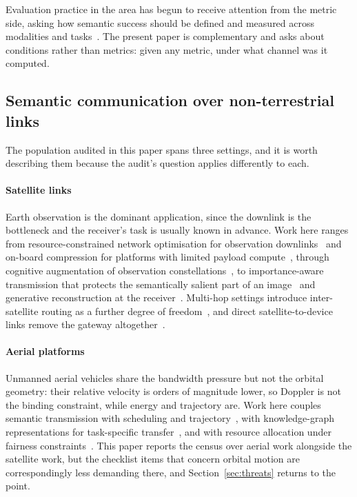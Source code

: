 \documentclass[preprint,11pt,3p]{elsarticle}
\begin{document}
Evaluation practice in the area has begun to receive attention from the metric side, asking how
semantic success should be defined and measured across modalities and tasks~\cite{metrics2026}. The present paper is
complementary and asks about conditions rather than metrics: given any metric, under what channel
was it computed.

\subsection{Semantic communication over non-terrestrial links}

The population audited in this paper spans three settings, and it is worth describing them
because the audit's question applies differently to each.

\paragraph{Satellite links}
Earth observation is the dominant application, since the downlink is the bottleneck and the
receiver's task is usually known in advance. Work here ranges from resource-constrained network
optimisation for observation downlinks~\cite{hassan2024r95} and on-board compression for
platforms with limited payload compute~\cite{bhattacharjee2024r113}, through cognitive
augmentation of observation constellations~\cite{chou2024r154}, to importance-aware transmission
that protects the semantically salient part of an image~\cite{cao2025r94} and generative
reconstruction at the receiver~\cite{jiang2024r93,zhang2024r161}. Multi-hop settings introduce
inter-satellite routing as a further degree of freedom~\cite{zeng2026r81,huang2026r117}, and
direct satellite-to-device links remove the gateway
altogether~\cite{huang2026r165,nguyen2024r115}.

\paragraph{Aerial platforms}
Unmanned aerial vehicles share the bandwidth pressure but not the orbital geometry: their
relative velocity is orders of magnitude lower, so Doppler is not the binding constraint, while
energy and trajectory are. Work here couples semantic transmission with scheduling and
trajectory~\cite{tian2026r178,zheng2026r190}, with knowledge-graph representations for
task-specific transfer~\cite{song2024r102,joshi2026r179}, and with resource allocation under
fairness constraints~\cite{siyun2025r191,sankara2026r186}. This paper reports the census over
aerial work alongside the satellite work, but the checklist items that concern orbital motion
are correspondingly less demanding there, and Section~\ref{sec:threats} returns to the point.
\end{document}
